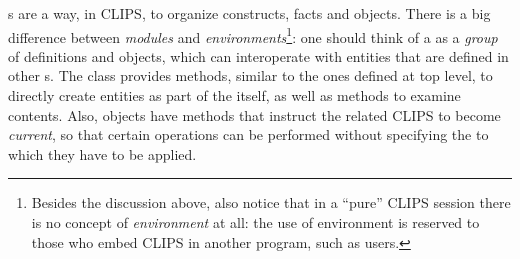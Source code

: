 s are a way, in CLIPS, to organize constructs, facts and
objects. There is a big difference between \emph{modules} and
\emph{environments}\footnote{Besides the discussion above, also notice
that in a ``pure'' CLIPS session there is no concept of \emph{environment}
at all: the use of environment is reserved to those who embed CLIPS in
another program, such as \pyclips{} users.}: one should think of a
 as a \emph{group} of definitions and objects, which can
interoperate with entities that are defined in other s. The
 class provides methods, similar to the ones defined at top
level, to directly create entities as part of the  itself,
as well as methods to examine  contents. Also,
 objects have methods that instruct the related CLIPS
 to become \emph{current}, so that certain operations can
be performed without specifying the  to which they have to
be applied.

